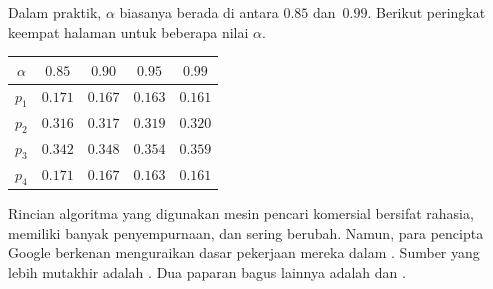 Dalam praktik, $\alpha$ biasanya berada di antara $0.85$ dan~$0.99$. Berikut
peringkat keempat halaman untuk beberapa nilai $\alpha$.
\begin{center}
  \begin{tabular}{r|cccc}
    \multicolumn{1}{c}{$\alpha$}
          &$0.85$  &$0.90$  &$0.95$ &$0.99$ \\ \hline
    $p_1$ &$0.171$ &$0.167$ &$0.163$  &$0.161$  \\
    $p_2$ &$0.316$ &$0.317$ &$0.319$  &$0.320$  \\
    $p_3$ &$0.342$ &$0.348$ &$0.354$  &$0.359$  \\
    $p_4$ &$0.171$ &$0.167$ &$0.163$  &$0.161$  
  \end{tabular}
\end{center}


\medskip
Rincian algoritma yang digunakan mesin pencari komersial bersifat rahasia,
memiliki banyak penyempurnaan, dan sering berubah. Namun, para pencipta Google
berkenan menguraikan dasar pekerjaan mereka dalam \cite{BrinPage}. Sumber yang
lebih mutakhir adalah \cite{WikipediaPageRank}. Dua paparan bagus lainnya adalah
\cite{Wills} dan \cite{Austin}.

